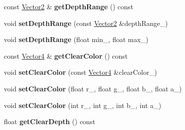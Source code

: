 \begin{DoxyCompactItemize}
\item 
const \hyperlink{class_i_dream_sky_1_1_vector2}{Vector2} \& {\bfseries get\+Depth\+Range} () const \hypertarget{class_i_dream_sky_1_1_g_x_context_a1ddb2db7fd0ce68054072bda645cd33e}{}\label{class_i_dream_sky_1_1_g_x_context_a1ddb2db7fd0ce68054072bda645cd33e}

\item 
void {\bfseries set\+Depth\+Range} (const \hyperlink{class_i_dream_sky_1_1_vector2}{Vector2} \&depth\+Range\+\_\+)\hypertarget{class_i_dream_sky_1_1_g_x_context_a6f0e057916a656461647ff330dc71a4a}{}\label{class_i_dream_sky_1_1_g_x_context_a6f0e057916a656461647ff330dc71a4a}

\item 
void {\bfseries set\+Depth\+Range} (float min\+\_\+, float max\+\_\+)\hypertarget{class_i_dream_sky_1_1_g_x_context_a4763b1959d84d92446880c2ff45a659a}{}\label{class_i_dream_sky_1_1_g_x_context_a4763b1959d84d92446880c2ff45a659a}

\item 
const \hyperlink{class_i_dream_sky_1_1_vector4}{Vector4} \& {\bfseries get\+Clear\+Color} () const \hypertarget{class_i_dream_sky_1_1_g_x_context_ab9375a8421a7b455ef976df96d44ec38}{}\label{class_i_dream_sky_1_1_g_x_context_ab9375a8421a7b455ef976df96d44ec38}

\item 
void {\bfseries set\+Clear\+Color} (const \hyperlink{class_i_dream_sky_1_1_vector4}{Vector4} \&clear\+Color\+\_\+)\hypertarget{class_i_dream_sky_1_1_g_x_context_a9238232c9d1d243930f35bed59a2c5eb}{}\label{class_i_dream_sky_1_1_g_x_context_a9238232c9d1d243930f35bed59a2c5eb}

\item 
void {\bfseries set\+Clear\+Color} (float r\+\_\+, float g\+\_\+, float b\+\_\+, float a\+\_\+)\hypertarget{class_i_dream_sky_1_1_g_x_context_a14fba60878def7efcd65a996f08fe6db}{}\label{class_i_dream_sky_1_1_g_x_context_a14fba60878def7efcd65a996f08fe6db}

\item 
void {\bfseries set\+Clear\+Color} (int r\+\_\+, int g\+\_\+, int b\+\_\+, int a\+\_\+)\hypertarget{class_i_dream_sky_1_1_g_x_context_a30e4d804bd3efd71b8a5805ab44df135}{}\label{class_i_dream_sky_1_1_g_x_context_a30e4d804bd3efd71b8a5805ab44df135}

\item 
float {\bfseries get\+Clear\+Depth} () const \hypertarget{class_i_dream_sky_1_1_g_x_context_a3e81c982d218564e62a48cdb129ed2c2}{}\label{class_i_dream_sky_1_1_g_x_context_a3e81c982d218564e62a48cdb129ed2c2}


\end{DoxyCompactItemize}
